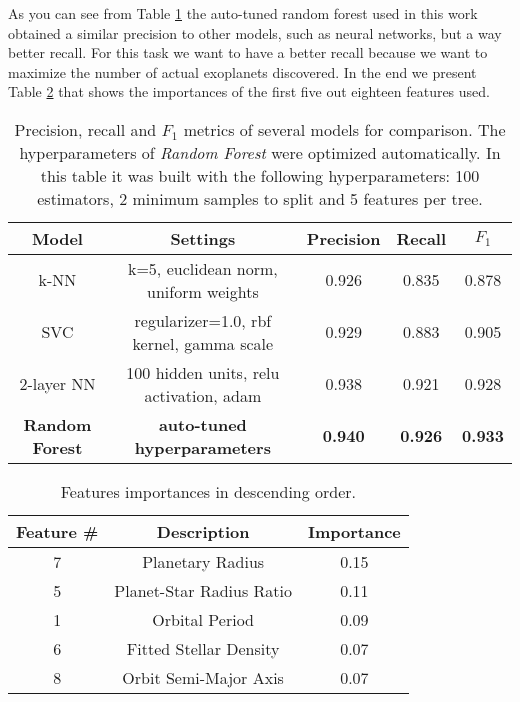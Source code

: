 \documentclass[11pt, a4paper]{article}
\begin{document}
\begin{multicols}{2}
  As you can see from Table \ref{table:benchmark} the auto-tuned random forest used in this work obtained a similar precision to other models, such as neural networks, but a way better recall. For this task we want to have a better recall because we want to maximize the number of actual exoplanets discovered.
  In the end we present Table \ref{table:importances} that shows the importances of the first five out eighteen features used.
\end{multicols}

  \begin{table}
    \centering
    \begin{tabular}{|c c c c c|}
      \hline
      Model & Settings & Precision & Recall & $F_{1}$  \\
      \hline\hline
      k-NN & k=5, euclidean norm, uniform weights & 0.926 & 0.835 & 0.878 \\
      \hline
      SVC & regularizer=1.0, rbf kernel, gamma scale & 0.929 & 0.883 & 0.905 \\
      \hline
      2-layer NN & 100 hidden units, relu activation, adam & 0.938 & 0.921 & 0.928 \\
      \hline
      \textbf{Random Forest} & \textbf{auto-tuned hyperparameters} & \textbf{0.940} & \textbf{0.926} & \textbf{0.933} \\
      \hline
    \end{tabular}
    \caption{Precision, recall and $F_{1}$ metrics of several models for comparison. The hyperparameters of \textit{Random Forest} were optimized automatically. In this table it was built with the following hyperparameters: 100 estimators, 2 minimum samples to split and 5 features per tree.}
    \label{table:benchmark}
  \end{table}

  \begin{table}
    \centering
    \begin{tabular}{|c c c|}
    \hline
    Feature \# & Description & Importance \\
    \hline\hline
    7 & Planetary Radius & 0.15 \\
    5 & Planet-Star Radius Ratio & 0.11 \\
    1 & Orbital Period & 0.09 \\
    6 & Fitted Stellar Density & 0.07 \\
    8 & Orbit Semi-Major Axis & 0.07 \\
    \hline
    \end{tabular}
    \caption{Features importances in descending order.}
    \label{table:importances}
  \end{table}
\end{document}
